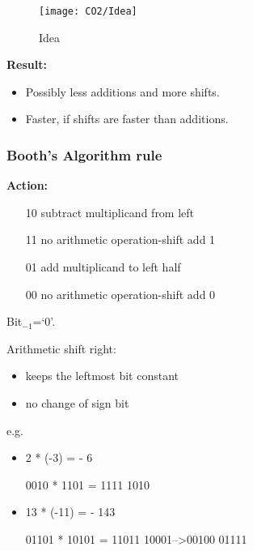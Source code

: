 \quad

\begin{figure}[H]
    \centering
    \texttt{[image: CO2/Idea]}
    \caption{Idea}
\end{figure}


\textbf{Result:}
\begin{itemize}
    \item Possibly less additions and more shifts. 
    \item Faster, if shifts are faster than additions. 
\end{itemize}

\subsubsection{Booth's Algorithm rule}
\textbf{Action: }
\begin{itemize}
    \item [10] subtract multiplicand from left
    \item [11] no arithmetic operation-shift add 1
    \item [01] add multiplicand to left half
    \item [00] no arithmetic operation-shift add 0
\end{itemize}
Bit${}_{-1}$=`0'. 

Arithmetic shift right: 
\begin{itemize}
    \item keeps the leftmost bit constant
    \item no change of sign bit
\end{itemize}

e.g. 
\begin{itemize}
    \item 2 * (-3) = - 6
    
    0010 * 1101 = 1111 1010
    \item 13 * (-11) = - 143
    
    01101 * 10101 = 11011 10001-->00100 01111
\end{itemize}

